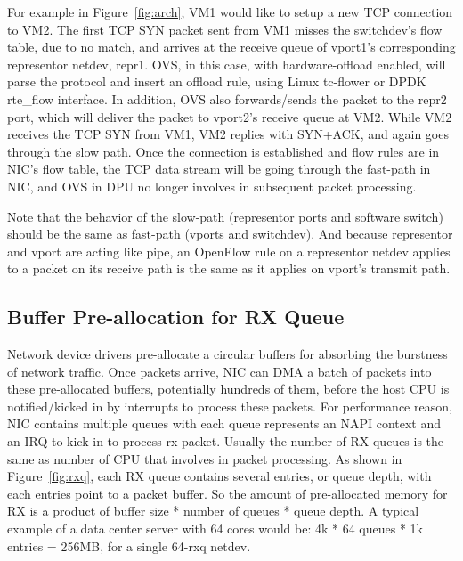 \documentclass[letterpaper]{article}
\begin{document}
For example in Figure~\ref{fig:arch}, VM1 would like to setup a new TCP
connection to VM2. The first TCP SYN packet sent from VM1 misses the
switchdev's flow table, due to no match, and arrives at the receive
queue of vport1's corresponding representor netdev, repr1.
OVS, in this case, with hardware-offload enabled, will parse the protocol
and insert an offload rule, using Linux tc-flower or DPDK rte\_flow interface.
In addition, OVS also forwards/sends the packet to the repr2 port, which
will deliver the packet to vport2's receive queue at VM2.
While VM2 receives the TCP SYN from VM1, VM2 replies with SYN+ACK, and
again goes through the slow path. Once the connection is established
and flow rules are in NIC's flow table, the TCP data stream will be
going through the fast-path in NIC, and OVS in DPU no longer involves
in subsequent packet processing.

Note that the behavior of the slow-path (representor ports and software
switch) should be the same as fast-path (vports and switchdev).
And because representor and vport are acting like pipe, an OpenFlow
rule on a representor netdev applies to a packet on its
receive path is the same as it applies on vport's transmit path.

\subsection{Buffer Pre-allocation for RX Queue}
Network device drivers pre-allocate a circular buffers for absorbing the
burstness of network traffic.
Once packets arrive, NIC can DMA a batch of packets into these pre-allocated buffers,
potentially hundreds of them, before the host CPU is notified/kicked in
by interrupts to process these packets.
For performance reason, NIC contains multiple queues with each queue
represents an NAPI context and an IRQ to kick in to process rx packet.
Usually the number of RX queues is the same as number of CPU that involves
in packet processing.
As shown in Figure~\ref{fig:rxq}, each RX queue contains several entries, 
or queue depth, with each entries
point to a packet buffer. So the amount of pre-allocated memory for RX
is a product of buffer size * number of queues * queue depth.
A typical example of a data center server with 64 cores would be:
4k * 64 queues * 1k entries = 256MB, for a single 64-rxq netdev.
\end{document}
